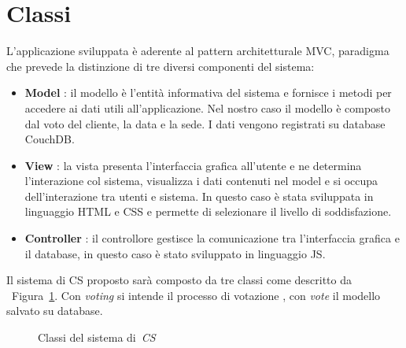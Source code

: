 \newpage
\section{Classi}
L'applicazione sviluppata è aderente al pattern architetturale
\ac{MVC}, paradigma che prevede la distinzione di tre diversi
componenti del sistema:
\begin{itemize}
  \item \textbf{Model} : il modello è l'entità informativa del sistema e
  fornisce i metodi per accedere ai dati utili all'applicazione. Nel nostro caso il
  modello è composto dal voto del cliente, la data e la sede. I dati vengono
  registrati su database CouchDB.
  \item \textbf{View} : la vista presenta l'interfaccia grafica all'utente e ne
  determina l'interazione col sistema, visualizza i dati contenuti nel model e
  si occupa dell'interazione tra utenti e sistema. In questo caso è
  stata sviluppata in linguaggio \ac{HTML} e \ac{CSS} e permette di selezionare
  il livello di soddisfazione.
  \item \textbf{Controller} : il controllore gestisce la comunicazione tra
  l'interfaccia grafica e il database, in questo caso è stato sviluppato in
  linguaggio \ac{JS}.
\end{itemize}
Il sistema di \ac{CS} proposto sarà composto da tre classi come descritto da
~Figura~\ref{fig:classes}. Con \emph{voting} si intende il processo di votazione
, con \emph{vote} il modello salvato su database.
\begin{figure}[!h]
  \centering
  \caption{Classi del sistema di~\emph{CS}}
  \label{fig:classes}
\end{figure}
